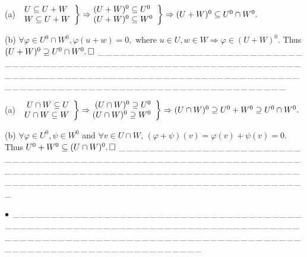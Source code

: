 \documentclass[a4paper, 11pt, UTF8]{article}
\def\BulletPoint{{\small$\bullet$}}
\def\ProblemEnding{{\tiny \_\,\_\,\_\,\_\,\_\,\_\,\_\,\_\,\_\,\_\,\_\,\_\,\_\,\_\,\_\,\_\,\_\,\_\,\_\,\_\,\_\,\_\,\_\,\_\,\_\,\_\,\_\,\_\,\_\,\_\,\_\,\_\,\_\,\_\,\_\,\_\,\_\,\_\,\_\,\_\,\_\,\_\,\_\,\_\,\_\,\_\,\_\,\_\,\_\,\_\,\_\,\_\,\_\,\_\,\_\,\_\,\_\,\_\,\_\,\_\,\_\,\_\,\_\,\_\,\_\,\_\,\_\,\_\,\_\,\_\,\_\_\,\_\,\_\,\_\,\_\,\_\,\_\,\_\,\_\,\_\,\_\,\_\,\_\,\_\,\_\,\_\,\_\,\_\,\_\,\_\,\_\,\_\,\_\,\_\,\_\,\_\,\_\,\_\,\_\,\_\,\_\,\_\,\_\,\_\,\_\,\_\,\_\,\_\,\_\,\_\,\_\,\_\,\_\,\_\,\_\,\_\,\_\,\_\,\_\,\_\,\_\,\_\,\_\,\_\,\_\,\_\,\_\,\_\,\_\,\_\,\_\,\_\,\_\,\_\,\_\,\_\,\_\,\_\,\_\,\_\,\_}}
\begin{document}
\begin{large}
\par\quad
(a) $\MathRightBrace{l}{U\subseteq U+W\\W\subseteq U+W}\Rightarrow\hspace{-6pt}\MathRightBrace{l}{(U+W)^0\subseteq U^0 \\ (U+W)^0\subseteq W^0}\Rightarrow(U+W)^0\subseteq U^0\cap W^0.$\par\vspace{6pt}\quad
(b) $\forall\varphi\in U^0\cap W^0,\varphi(u+w)=0,$ where $u\in U,w\in W \Rightarrow\varphi\in (U+W)^0$. Thus $(U+W)^0\supseteq U^0\cap W^0.\,\hfill\square$
\ProblemEnding\par

\par\quad
(a) $\MathRightBrace{r}{U\cap W\subseteq U\\U\cap W\subseteq W}\Rightarrow\hspace{-6pt}\MathRightBrace{r}{(U\cap W)^0\supseteq U^0 \\ (U\cap W)^0\supseteq W^0}\Rightarrow(U\cap W)^0\supseteq U^0+W^0\supseteq U^0\cap W^0.$\par\vspace{6pt}\quad
(b) $\forall\varphi\in U^0,\psi\in W^0$ and $\forall v\in U\cap W$, $(\varphi+\psi)(v)=\varphi(v)+\psi(v)=0$. Thus $U^0+W^0\subseteq (U\cap W)^0.\,\hfill\square$
\ProblemEnding\par

\BulletPoint \,\hspace{1pt}\Corollary\;\;
\ProblemEnding\par


\end{large}
\end{document}
